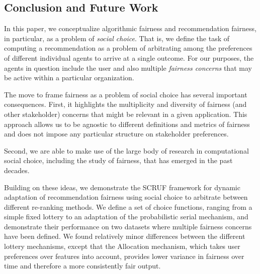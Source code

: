 \subsection{Conclusion and Future Work}
In this paper, we conceptualize algorithmic fairness and recommendation fairness, in particular, as a problem of \textit{social choice}. That is, we define the task of computing a recommendation as a problem of arbitrating among the preferences of different individual agents to arrive at a single outcome. For our purposes, the agents in question include the user and also multiple \textit{fairness concerns} that may be active within a particular organization. 

The move to frame fairness as a problem of social choice has several important consequences. First, it highlights the multiplicity and diversity of fairness (and other stakeholder) concerns that might be relevant in a given application. This approach allows us to be agnostic to different definitions and metrics of fairness and does not impose any particular structure on stakeholder preferences.

Second, we are able to make use of the large body of research in computational social choice, including the study of fairness, that has emerged in the past decades. 

Building on these ideas, we demonstrate the SCRUF framework for dynamic adaptation of recommendation fairness using social choice to arbitrate between different re-ranking methods. We define a set of choice functions, ranging from a simple fixed lottery to an adaptation of the probabilistic serial mechanism, and demonstrate their performance on two datasets where multiple fairness concerns have been defined. We found relatively minor differences between the different lottery mechanisms, except that the Allocation mechanism, which takes user preferences over features into account, provides lower variance in fairness over time and therefore a more consistently fair output.








